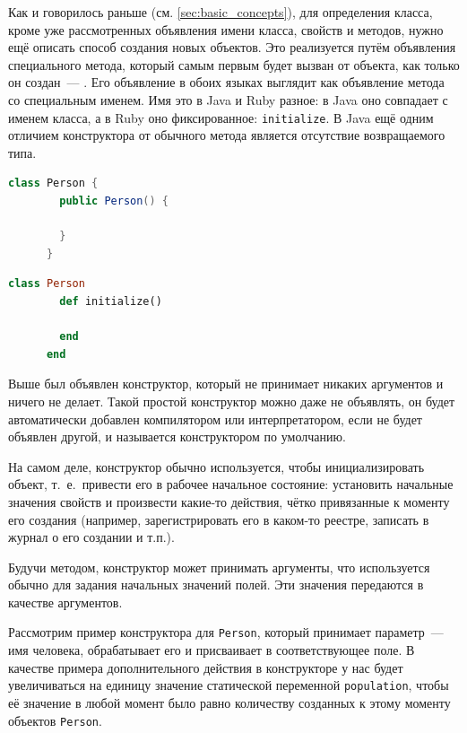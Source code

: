\documentclass[a4paper, 14pt, titlepage]{extarticle}
\newcommand{\define}[1]{\uwave{#1}}
\newcommand{\ie}{т.~е.~}
\newenvironment{halfpage}%
    {\noindent\begin{minipage}[h]{0.49\linewidth}} %
    {\end{minipage}\hfill}
\newcommand{\inlinecode}[2][Java]{\lstinline[basicstyle=\ttfamily, language=#1]{#2}}
\begin{document}
  Как и говорилось раньше (см. \ref{sec:basic_concepts}), для определения класса, кроме уже
  рассмотренных объявления имени класса, свойств и методов, нужно ещё описать способ создания новых
  объектов. Это реализуется путём объявления специального метода, который самым первым будет вызван
  от объекта, как только он создан~--- \define{конструктора}. Его объявление в обоих языках выглядит
  как объявление метода со специальным именем. Имя это в Java и Ruby разное: в Java оно совпадает с
  именем класса, а в Ruby оно фиксированное: \inlinecode[Ruby]{initialize}. В Java ещё одним
  отличием конструктора от обычного метода является отсутствие возвращаемого типа.

  \begin{halfpage}
    \begin{lstlisting}[language=Java, title={Трививальный конструктор в Java}, gobble=6, texcl]
      class Person {
        public Person() {

        }
      }
    \end{lstlisting}
  \end{halfpage}
  \begin{halfpage}
    \begin{lstlisting}[language=Ruby, title={Тривиальный конструктор в Ruby}, gobble=6, texcl]
      class Person
        def initialize()

        end
      end
    \end{lstlisting}
  \end{halfpage}

  Выше был объявлен конструктор, который не принимает никаких аргументов и ничего не делает. Такой
  простой конструктор можно даже не объявлять, он будет автоматически добавлен компилятором или
  интерпретатором, если не будет объявлен другой, и называется конструктором по умолчанию.

  На самом деле, конструктор обычно используется, чтобы инициализировать объект, \ie привести его в
  рабочее начальное состояние: установить начальные значения свойств и произвести какие-то действия,
  чётко привязанные к моменту его создания (например, зарегистрировать его в каком-то реестре,
  записать в журнал о его создании и т.п.).

  Будучи методом, конструктор может принимать аргументы, что используется обычно для задания
  начальных значений полей. Эти значения передаются в качестве аргументов.

  Рассмотрим пример конструктора для \inlinecode{Person}, который принимает параметр~--- имя
  человека, обрабатывает его и присваивает в соответствующее поле. В качестве примера
  дополнительного действия в конструкторе у нас будет увеличиваться на единицу значение статической
  переменной \inlinecode{population}, чтобы её значение в любой момент было равно количеству
  созданных к этому моменту объектов \inlinecode{Person}.
\end{document}
